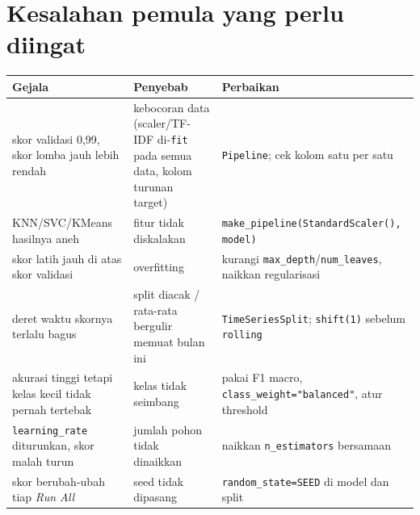 \documentclass[10pt,a4paper]{article}
\newcommand{\kode}[1]{\texttt{\small #1}}
\begin{document}
\section*{Kesalahan pemula yang perlu diingat}
{\small
\begin{tabularx}{\linewidth}{@{}P{4.4cm}>{\raggedright\arraybackslash}X>{\raggedright\arraybackslash}X@{}}
\toprule
Gejala & Penyebab & Perbaikan\\ \midrule
skor validasi 0,99, skor lomba jauh lebih rendah & kebocoran data (scaler/TF-IDF di-\kode{fit} pada semua data, kolom turunan target)
& \kode{Pipeline}; cek kolom satu per satu\\
KNN/SVC/KMeans hasilnya aneh & fitur tidak diskalakan & \kode{make\_pipeline(StandardScaler(), model)}\\
skor latih jauh di atas skor validasi & overfitting & kurangi \kode{max\_depth}/\kode{num\_leaves}, naikkan regularisasi\\
deret waktu skornya terlalu bagus & split diacak / rata-rata bergulir memuat bulan ini & \kode{TimeSeriesSplit}; \kode{shift(1)} sebelum \kode{rolling}\\
akurasi tinggi tetapi kelas kecil tidak pernah tertebak & kelas tidak seimbang & pakai F1 macro, \kode{class\_weight="balanced"}, atur threshold\\
\kode{learning\_rate} diturunkan, skor malah turun & jumlah pohon tidak dinaikkan & naikkan \kode{n\_estimators} bersamaan\\
skor berubah-ubah tiap \emph{Run All} & seed tidak dipasang & \kode{random\_state=SEED} di model dan split\\ \bottomrule
\end{tabularx}}
\end{document}
